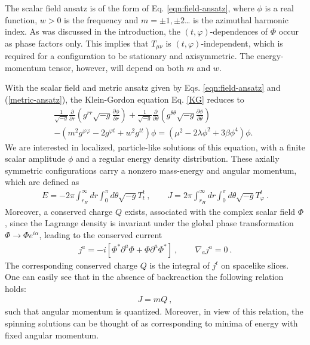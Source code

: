 The scalar field ansatz is of the form of Eq. \eqref{eqn:field-ansatz}, 
 where $\phi$ is a real function, $w>0$ is the frequency and $m=\pm 1,\pm 2$\dots
is the azimuthal harmonic index. 
As was discussed in the introduction, the $(t, \varphi)$-dependences of $\Phi$ occur as phase factors only.
This implies that $T_{\mu\nu}$ is $(t, \varphi)$-independent, which is required for
a configuration to be stationary and axisymmetric.
The energy-momentum tensor, however,  will 
 depend on both $m$ and $w$.

With the scalar field and metric ansatz given by Eqs. \eqref{eqn:field-ansatz} and (\ref{metric-ansatz}), 
the Klein-Gordon equation Eq. \eqref{KG}
reduces to
\begin{eqnarray}
\label{KG1}
\frac{1}{\sqrt{-g}}\frac{\partial}{\partial r}\left(g^{rr}\sqrt{-g}\frac{\partial \phi}{\partial r} \right)+
\frac{1}{\sqrt{-g}}\frac{\partial}{\partial \theta} \left(g^{\theta \theta}\sqrt{-g}\frac{\partial \phi}{\partial \theta} \right)
\nonumber\\
-\left(
m^2 g^{\varphi \varphi}-2g^{\varphi t} +w^2 g^{tt} 
\right)\phi
=(\mu^2-2 \lambda \phi^2+3\beta \phi^4)\phi.~{~}
\end{eqnarray}
We are interested in 
localized, particle-like solutions of this equation,
 with a finite scalar amplitude $\phi$ and a regular energy density distribution.
These axially symmetric configurations carry a nonzero 
  mass-energy and angular momentum,  which are defined as
\begin{eqnarray}
\label{scalar-charges}
E=-2\pi \int_{r_H}^\infty dr \int_0^\pi d\theta \sqrt{-g}T_t^t\ , \qquad 
J= 2\pi \int_{r_H}^\infty dr \int_0^\pi d\theta \sqrt{-g}T_\varphi^t \ .
 \end{eqnarray}
%
Moreover, a conserved charge $Q$ exists, associated with the complex scalar field $\Phi$, since the Lagrange density is invariant under the global phase transformation
$\Phi \to \Phi e^{i\alpha}$, 
 leading to the conserved current
 \begin{eqnarray}
\label{scalar-current}
j^{a}=-i\left[\Phi^* \partial^a\Phi+\Phi \partial^a\Phi^*\right]\ , \qquad \nabla_aj^{a}=0 \ .
 \end{eqnarray}
The corresponding conserved charge $Q$ is the integral of $j^t$ on spacelike slices.
One can easily see that in the absence of backreaction the following relation holds:
 \begin{eqnarray}
\label{rel1}
J=m Q\ ,
\end{eqnarray}
such that  angular momentum  is quantized.
Moreover,
in view of this relation, the spinning solutions
can be thought of as corresponding to minima of energy with fixed angular
momentum.
 
